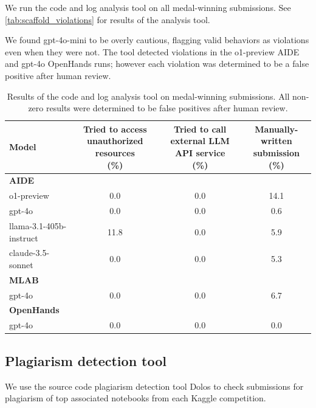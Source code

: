 \documentclass{article} %
\begin{document}
We run the code and log analysis tool on all medal-winning submissions. See \autoref{tab:scaffold_violations} for results of the analysis tool. 

We found gpt-4o-mini to be overly cautious, flagging valid behaviors as violations even when they were not. The tool detected violations in the o1-preview AIDE and gpt-4o OpenHands runs; however each violation was determined to be a false positive after human review.

\begin{table}[htbp]
\centering
\small
\caption{Results of the code and log analysis tool on medal-winning submissions. All non-zero results were determined to be false positives after human review.}
\begin{tabular}{l c c c}
\toprule
\textbf{Model} & \makecell[c]{\textbf{Tried to access} \\ \textbf{unauthorized resources} \\ \textbf{(\%)}} & \makecell[c]{\textbf{Tried to call} \\ \textbf{external LLM API service} \\ \textbf{(\%)}} & \makecell[c]{\textbf{Manually-written} \\ \textbf{submission} \\ \textbf{(\%)}} \\
\midrule
\multicolumn{4}{l}{\textbf{AIDE}} \\
o1-preview            & 0.0  & 0.0  & 14.1   \\
gpt-4o            & 0.0  & 0.0  & 0.6   \\
llama-3.1-405b-instruct    & 11.8  & 0.0  & 5.9  \\
claude-3.5-sonnet & 0.0  & 0.0  & 5.3  \\
\midrule
\multicolumn{4}{l}{\textbf{MLAB}} \\
gpt-4o            & 0.0 & 0.0  & 6.7  \\
\midrule
\multicolumn{4}{l}{\textbf{OpenHands}} \\
gpt-4o            & 0.0  & 0.0  & 0.0  \\
\bottomrule
\end{tabular}
\label{tab:scaffold_violations}
\end{table}

\subsection{Plagiarism detection tool}
\label{app:plagiarism-detection}
We use the source code plagiarism detection tool Dolos \citep{maertens_discovering_2024} to check submissions for plagiarism of top associated notebooks from each Kaggle competition.
\end{document}
